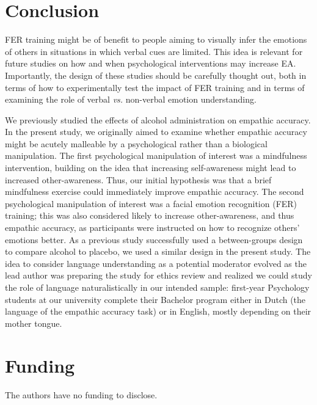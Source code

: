 \documentclass[authordate, empirical]{jote-new-article}
\begin{document}
    

	\section{Conclusion}



	FER training might be of benefit to people aiming to visually infer the emotions of others in situations in which verbal cues are limited. This idea is relevant for future studies on how and when psychological interventions may increase EA. Importantly, the design of these studies should be carefully thought out, both in terms of how to experimentally test the impact of FER training and in terms of examining the role of verbal \emph{vs.} non-verbal emotion understanding.

    \begin{originalPurpose}
        We previously studied the effects of alcohol administration on empathic accuracy. In the present study, we originally aimed to examine whether empathic accuracy might be acutely malleable by a psychological rather than a biological manipulation. The first psychological manipulation of interest was a mindfulness intervention, building on the idea that increasing self-awareness might lead to increased other-awareness. Thus, our initial hypothesis was that a brief mindfulness exercise could immediately improve empathic accuracy. The second psychological manipulation of interest was a facial emotion recognition (FER) training; this was also considered likely to increase other-awareness, and thus empathic accuracy, as participants were instructed on how to recognize others' emotions better. As a previous study successfully used a between-groups design to compare alcohol to placebo, we used a similar design in the present study. The idea to consider language understanding as a potential moderator evolved as the lead author was preparing the study for ethics review and realized we could study the role of language naturalistically in our intended sample: first-year Psychology students at our university complete their Bachelor program either in Dutch (the language of the empathic accuracy task) or in English, mostly depending on their mother tongue.
    \end{originalPurpose}

	\section{Funding}

	The authors have no funding to disclose.
\end{document}
